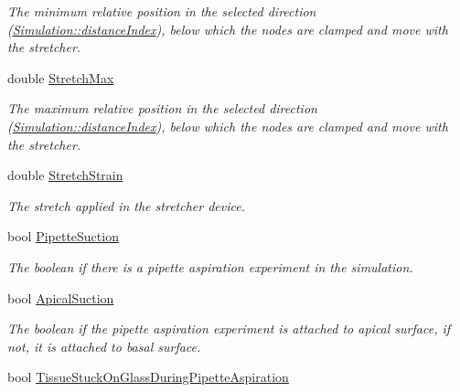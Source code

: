 \begin{DoxyCompactItemize}
\begin{DoxyCompactList}\small\item\em The minimum relative position in the selected direction (\hyperlink{classSimulation_ac21ce1a13eb2eedd549a1f61232b948b}{Simulation\+::distance\+Index}), below which the nodes are clamped and move with the stretcher. \end{DoxyCompactList}\item 
\hypertarget{classSimulation_a53227db1a41449ba235979fdd052f42e}{}double \hyperlink{classSimulation_a53227db1a41449ba235979fdd052f42e}{Stretch\+Max}\label{classSimulation_a53227db1a41449ba235979fdd052f42e}

\begin{DoxyCompactList}\small\item\em The maximum relative position in the selected direction (\hyperlink{classSimulation_ac21ce1a13eb2eedd549a1f61232b948b}{Simulation\+::distance\+Index}), below which the nodes are clamped and move with the stretcher. \end{DoxyCompactList}\item 
\hypertarget{classSimulation_a76aca0fc8a6de8550af15556d18e6dfb}{}double \hyperlink{classSimulation_a76aca0fc8a6de8550af15556d18e6dfb}{Stretch\+Strain}\label{classSimulation_a76aca0fc8a6de8550af15556d18e6dfb}

\begin{DoxyCompactList}\small\item\em The stretch applied in the stretcher device. \end{DoxyCompactList}\item 
\hypertarget{classSimulation_a10cfa63b384b954f5ea34afca788f298}{}bool \hyperlink{classSimulation_a10cfa63b384b954f5ea34afca788f298}{Pipette\+Suction}\label{classSimulation_a10cfa63b384b954f5ea34afca788f298}

\begin{DoxyCompactList}\small\item\em The boolean if there is a pipette aspiration experiment in the simulation. \end{DoxyCompactList}\item 
\hypertarget{classSimulation_a53d18b41ab9318966acb05815ab4deb0}{}bool \hyperlink{classSimulation_a53d18b41ab9318966acb05815ab4deb0}{Apical\+Suction}\label{classSimulation_a53d18b41ab9318966acb05815ab4deb0}

\begin{DoxyCompactList}\small\item\em The boolean if the pipette aspiration experiment is attached to apical surface, if not, it is attached to basal surface. \end{DoxyCompactList}\item 
\hypertarget{classSimulation_aac639bb76a25b8df8917d6e288358110}{}bool \hyperlink{classSimulation_aac639bb76a25b8df8917d6e288358110}{Tissue\+Stuck\+On\+Glass\+During\+Pipette\+Aspiration}\label{classSimulation_aac639bb76a25b8df8917d6e288358110}


\end{DoxyCompactItemize}
